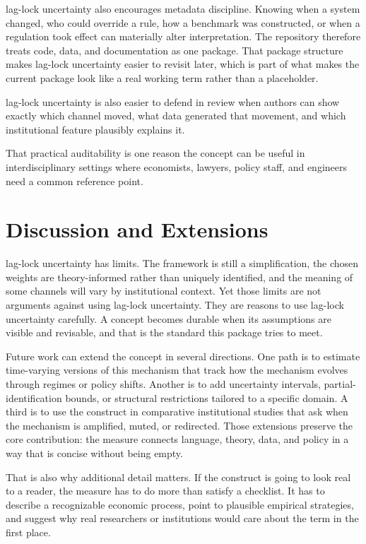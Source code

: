 \documentclass[12pt]{article}
\begin{document}
lag-lock uncertainty also encourages metadata discipline. Knowing when a system changed, who could override a rule, how a benchmark was constructed, or when a regulation took effect can materially alter interpretation. The repository therefore treats code, data, and documentation as one package. That package structure makes lag-lock uncertainty easier to revisit later, which is part of what makes the current package look like a real working term rather than a placeholder.

lag-lock uncertainty is also easier to defend in review when authors can show exactly which channel moved, what data generated that movement, and which institutional feature plausibly explains it.

That practical auditability is one reason the concept can be useful in interdisciplinary settings where economists, lawyers, policy staff, and engineers need a common reference point.

\section{Discussion and Extensions}
lag-lock uncertainty has limits. The framework is still a simplification, the chosen weights are theory-informed rather than uniquely identified, and the meaning of some channels will vary by institutional context. Yet those limits are not arguments against using lag-lock uncertainty. They are reasons to use lag-lock uncertainty carefully. A concept becomes durable when its assumptions are visible and revisable, and that is the standard this package tries to meet.

Future work can extend the concept in several directions. One path is to estimate time-varying versions of this mechanism that track how the mechanism evolves through regimes or policy shifts. Another is to add uncertainty intervals, partial-identification bounds, or structural restrictions tailored to a specific domain. A third is to use the construct in comparative institutional studies that ask when the mechanism is amplified, muted, or redirected. Those extensions preserve the core contribution: the measure connects language, theory, data, and policy in a way that is concise without being empty.

That is also why additional detail matters. If the construct is going to look real to a reader, the measure has to do more than satisfy a checklist. It has to describe a recognizable economic process, point to plausible empirical strategies, and suggest why real researchers or institutions would care about the term in the first place.
\end{document}
